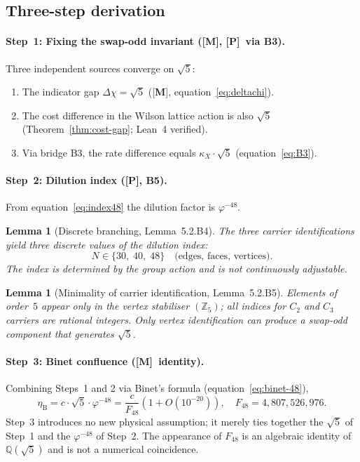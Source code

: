 \documentclass[sn-mathphys-num,Numbered]{sn-jnl}
\theoremstyle{thmstyleone}
\newtheorem{lemma}[theorem]{Lemma}
\theoremstyle{thmstylethree}
\theoremstyle{thmstyletwo}
\newcommand{\etaB}{\eta_{\mathrm{B}}}
\newcommand{\Qsqrt}{\mathbb{Q}(\sqrt{5})}
\newcommand{\tagM}{[\textbf{M}]}
\newcommand{\tagP}{[\textbf{P}]}
\begin{document}
\subsection{Three-step derivation}
\label{ssec:three-steps}

\paragraph{Step~1: Fixing the swap-odd invariant \textup{(\tagM, \tagP\ via B3)}.}
Three independent sources converge on $\sqrt{5}$:
\begin{enumerate}
  \item The indicator gap $\Delta\chi = \sqrt{5}$
    (\tagM, equation~\eqref{eq:deltachi}).
  \item The cost difference in the Wilson lattice action is also
    $\sqrt{5}$ (Theorem~\ref{thm:cost-gap}; Lean~4 verified).
  \item Via bridge B3, the rate difference equals
    $\kappa_X \cdot \sqrt{5}$ (equation~\eqref{eq:B3}).
\end{enumerate}

\paragraph{Step~2: Dilution index \textup{(\tagP, B5)}.}
From equation~\eqref{eq:index48} the dilution factor is
$\varphi^{-48}$.

\begin{lemma}[Discrete branching, Lemma~5.2.B4]
\label{lem:discrete-branch}
The three carrier identifications yield three discrete values of the
dilution index:
\[
  N \in \{30,\;40,\;48\}
  \quad\text{(edges, faces, vertices).}
\]
The index is determined by the group action and is not continuously
adjustable.
\end{lemma}

\begin{lemma}[Minimality of carrier identification, Lemma~5.2.B5]
\label{lem:carrier-min}
Elements of order~$5$ appear only in the vertex stabiliser
$(\mathbb{Z}_5)$; all indices for $C_2$ and $C_3$ carriers are rational
integers.  Only vertex identification can produce a swap-odd component
that generates $\sqrt{5}$.
\end{lemma}

\paragraph{Step~3: Binet confluence \textup{(\tagM\ identity)}.}
Combining Steps~1 and 2 via Binet's formula
(equation~\eqref{eq:binet-48}),
\begin{equation}
  \etaB = c \cdot \sqrt{5} \cdot \varphi^{-48}
         = \frac{c}{F_{48}}\!\left(1 + O(10^{-20})\right),
  \quad F_{48} = 4{,}807{,}526{,}976.
  \label{eq:etaB}
\end{equation}
Step~3 introduces no new physical assumption; it merely ties together
the $\sqrt{5}$ of Step~1 and the $\varphi^{-48}$ of Step~2.  The
appearance of $F_{48}$ is an algebraic identity of $\Qsqrt$ and is not
a numerical coincidence.
\end{document}

